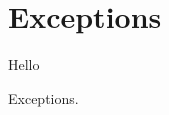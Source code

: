 \chapter{Exceptions}

Hello


\begin{syntaxfloat}
  
  \caption{Exceptions.}
  \label{syntax:exception}
\end{syntaxfloat}


